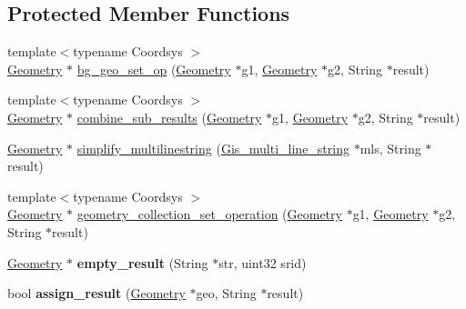 \subsection*{Protected Member Functions}
\begin{DoxyCompactItemize}
\item 
{\footnotesize template$<$typename Coordsys $>$ }\\\mbox{\hyperlink{classGeometry}{Geometry}} $\ast$ \mbox{\hyperlink{classItem__func__spatial__operation_a5adb62f7747c6e2ff52994d82d42d6c2}{bg\+\_\+geo\+\_\+set\+\_\+op}} (\mbox{\hyperlink{classGeometry}{Geometry}} $\ast$g1, \mbox{\hyperlink{classGeometry}{Geometry}} $\ast$g2, String $\ast$result)
\item 
{\footnotesize template$<$typename Coordsys $>$ }\\\mbox{\hyperlink{classGeometry}{Geometry}} $\ast$ \mbox{\hyperlink{classItem__func__spatial__operation_a7f61f6bb0b698dd8edb26b9527988997}{combine\+\_\+sub\+\_\+results}} (\mbox{\hyperlink{classGeometry}{Geometry}} $\ast$g1, \mbox{\hyperlink{classGeometry}{Geometry}} $\ast$g2, String $\ast$result)
\item 
\mbox{\hyperlink{classGeometry}{Geometry}} $\ast$ \mbox{\hyperlink{classItem__func__spatial__operation_ada24827906646fb03027634bdd613b4b}{simplify\+\_\+multilinestring}} (\mbox{\hyperlink{classGis__multi__line__string}{Gis\+\_\+multi\+\_\+line\+\_\+string}} $\ast$mls, String $\ast$result)
\item 
{\footnotesize template$<$typename Coordsys $>$ }\\\mbox{\hyperlink{classGeometry}{Geometry}} $\ast$ \mbox{\hyperlink{classItem__func__spatial__operation_acbd3c3c1484c7490cdc35635680782dd}{geometry\+\_\+collection\+\_\+set\+\_\+operation}} (\mbox{\hyperlink{classGeometry}{Geometry}} $\ast$g1, \mbox{\hyperlink{classGeometry}{Geometry}} $\ast$g2, String $\ast$result)
\item 
\mbox{\label{classItem__func__spatial__operation_a1d9eafb0e4891302085006da42557045}} 
\mbox{\hyperlink{classGeometry}{Geometry}} $\ast$ {\bfseries empty\+\_\+result} (String $\ast$str, uint32 srid)
\item 
\mbox{\label{classItem__func__spatial__operation_afa6cf65438e1db9cde96b00f3f579f35}} 
bool {\bfseries assign\+\_\+result} (\mbox{\hyperlink{classGeometry}{Geometry}} $\ast$geo, String $\ast$result)
\item 

\end{DoxyCompactItemize}

